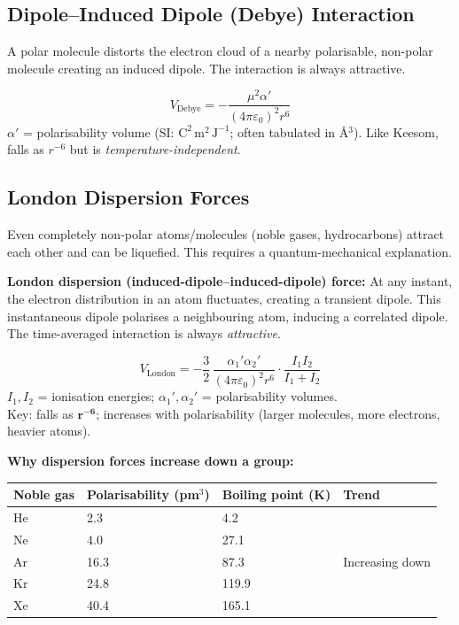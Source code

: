 \documentclass[12pt,a4paper]{article}
\begin{document}
\subsection{Dipole--Induced Dipole (Debye) Interaction}
A polar molecule distorts the electron cloud of a nearby polarisable, non-polar molecule creating an induced dipole. The interaction is always attractive.

\begin{tcolorbox}[formulabox, title={Debye Induction Energy}]
\[
V_{\mathrm{Debye}} = -\frac{\mu^2\alpha'}{(4\pi\varepsilon_0)^2 r^6}
\]
$\alpha'$ = polarisability volume (SI: $\mathrm{C^2\,m^2\,J^{-1}}$; often tabulated in \r{A}$^3$). Like Keesom, falls as $r^{-6}$ but is \emph{temperature-independent}.
\end{tcolorbox}

\subsection{London Dispersion Forces}
Even completely non-polar atoms/molecules (noble gases, hydrocarbons) attract each other and can be liquefied. This requires a quantum-mechanical explanation.

\begin{tcolorbox}[defbox]
\textbf{London dispersion (induced-dipole--induced-dipole) force:} At any instant, the electron distribution in an atom fluctuates, creating a transient dipole. This instantaneous dipole polarises a neighbouring atom, inducing a correlated dipole. The time-averaged interaction is always \emph{attractive}.
\end{tcolorbox}

\begin{tcolorbox}[formulabox, title={London Dispersion Energy}]
\[
V_{\mathrm{London}} = -\frac{3}{2}\,\frac{\alpha_1'\alpha_2'}{(4\pi\varepsilon_0)^2 r^6}\cdot\frac{I_1 I_2}{I_1+I_2}
\]
$I_1, I_2$ = ionisation energies; $\alpha_1', \alpha_2'$ = polarisability volumes.\\
Key: falls as $\boldsymbol{r^{-6}}$; increases with polarisability (larger molecules, more electrons, heavier atoms).
\end{tcolorbox}

\textbf{Why dispersion forces increase down a group:}

\begin{tabularx}{\linewidth}{|B{2.4cm}|Y|Y|Y|}
\hline
\textbf{Noble gas} & \textbf{Polarisability (pm$^3$)} & \textbf{Boiling point (K)} & \textbf{Trend} \\
\hline
He & 2.3 & 4.2 & \\
\hline
Ne & 4.0 & 27.1 & \\
\hline
Ar & 16.3 & 87.3 & Increasing down \\
\hline
Kr & 24.8 & 119.9 & \\
\hline
Xe & 40.4 & 165.1 & \\
\hline
\end{tabularx}
\end{document}
